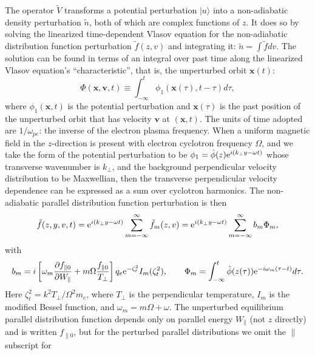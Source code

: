 \documentclass[12pt]{article}
\def\ket#1{|#1\rangle}
\def\etothe#1{{\rm e}^{#1}}
\begin{document}
The operator $\tilde{V}$ transforms a potential perturbation $\ket{u}$
into a non-adiabatic density perturbation $\tilde n$, both of which
are complex functions of $z$. It does so by solving the linearized
time-dependent Vlasov equation for the non-adiabatic distribution
function perturbation $\tilde f(z,v)$ and integrating it:
$\tilde n =\int \tilde f dv$. The solution can be found in terms
of an integral over past time along the linearized Vlasov equation's
``characteristic'', that is, the unperturbed orbit $\bm x(t)$:
\begin{equation}
  \label{eq:phim}
  \Phi(\bm x,\bm v,t)\equiv 
  \int_{-\infty}^t \phi_1(\bm x(\tau),t-\tau ) d\tau,
\end{equation}
where $\phi_1(\bm x,t)$ is the potential perturbation and
$\bm x(\tau)$ is the past position of the unperturbed orbit that has
velocity $\bm v$ at $(\bm x,t)$. The units of time adopted are
$1/\omega_{pe}$: the inverse of the electron plasma frequency. When a
uniform magnetic field in the $z$-direction is present with electron
cyclotron frequency $\Omega$, and we take the form of the potential
perturbation to be $\phi_1=\hat\phi(z){\rm e}^{i(k_\perp y-\omega t)}$
whose transverse wavenumber is $k_\perp$, and the background
perpendicular velocity distribution to be Maxwellian, then the
transverse perpendicular velocity dependence can be expressed as a sum
over cyclotron harmonics\cite{Hutchinson2018a}.  The non-adiabatic
parallel distribution function perturbation is then
\begin{equation}\label{eq:ftmagnetic}
    \tilde f(z,y,v,t) = {\rm e}^{i(k_\perp y-\omega t)}
    \sum_{m=-\infty}^\infty \tilde f_m(z,v)= {\rm e}^{i(k_\perp
      y-\omega t)} \sum_{m=-\infty}^\infty b_m \Phi_m,
\end{equation}
with
\begin{equation}
  \label{mweight}
   b_m=i\left[\omega_m
  {\partial f_{\parallel0}\over \partial W_\parallel}
  +m\Omega {f_{\parallel0}\over T_\perp}\right]
q_e{\rm e}^{-\zeta_t^2}I_m(\zeta_t^2),\qquad
\Phi_m=\int_{-\infty}^t \hat\phi(z(\tau))\etothe{-i\omega_m(\tau-t)}d\tau.
\end{equation}
Here $\zeta_t^2=k^2T_\perp/\Omega^2m_e$, where $T_\perp$ is the
perpendicular temperature, $I_m$ is the modified Bessel function, and
$\omega_m=m\Omega+\omega$. The unperturbed equilibrium parallel
distribution function depends only on parallel energy $W_\parallel$
(not $z$ directly) and is written $f_{\parallel 0}$, but for the
perturbed parallel distributions we omit the $\parallel$ subscript for
\end{document}
